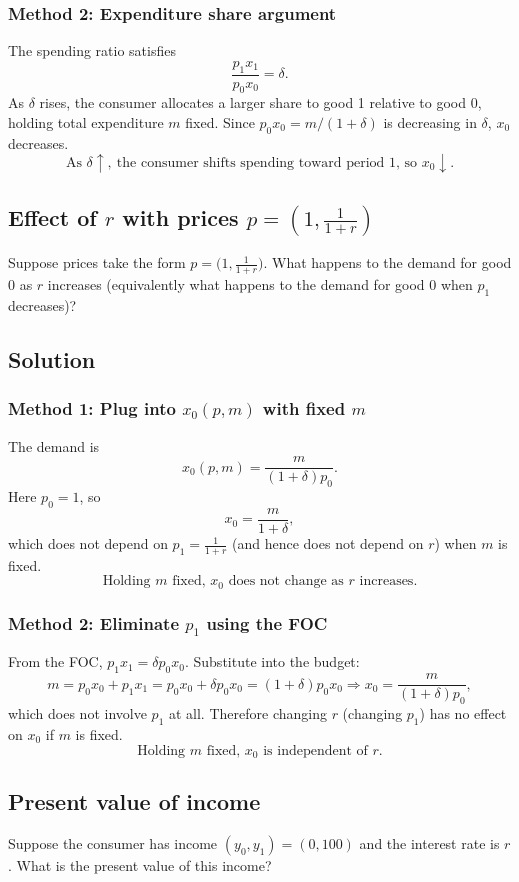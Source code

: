 \documentclass[12pt]{article}
\begin{document}
\subsubsection*{Method 2: Expenditure share argument}
The spending ratio satisfies
\[
\frac{p_1x_1}{p_0x_0}=\delta.
\]
As \(\delta\) rises, the consumer allocates a larger share to good 1 relative to good 0, holding total expenditure \(m\) fixed. Since \(p_0x_0=m/(1+\delta)\) is decreasing in \(\delta\), \(x_0\) decreases.
\[
\boxed{\;\text{As }\delta\uparrow,\ \text{the consumer shifts spending toward period 1, so }x_0\downarrow.\;}
\]

\subsection{Effect of \(r\) with prices \(p=(1,\frac{1}{1+r})\)}
Suppose prices take the form \(p=\bigl(1,\frac{1}{1+r}\bigr)\). What happens to the demand for good 0 as
\(r\) increases (equivalently what happens to the demand for good 0 when \(p_1\) decreases)?

\subsection*{Solution}
\subsubsection*{Method 1: Plug into \(x_0(p,m)\) with fixed \(m\)}
The demand is
\[
x_0(p,m)=\frac{m}{(1+\delta)p_0}.
\]
Here \(p_0=1\), so
\[
x_0=\frac{m}{1+\delta},
\]
which does not depend on \(p_1=\frac{1}{1+r}\) (and hence does not depend on \(r\)) when \(m\) is fixed.
\[
\boxed{\;\text{Holding }m\text{ fixed, }x_0\text{ does not change as }r\text{ increases.}\;}
\]

\subsubsection*{Method 2: Eliminate \(p_1\) using the FOC}
From the FOC, \(p_1x_1=\delta p_0x_0\). Substitute into the budget:
\[
m=p_0x_0+p_1x_1=p_0x_0+\delta p_0x_0=(1+\delta)p_0x_0
\Rightarrow
x_0=\frac{m}{(1+\delta)p_0},
\]
which does not involve \(p_1\) at all. Therefore changing \(r\) (changing \(p_1\)) has no effect on \(x_0\) if \(m\) is fixed.
\[
\boxed{\;\text{Holding }m\text{ fixed, }x_0\text{ is independent of }r.\;}
\]

\subsection{Present value of income}
Suppose the consumer has income \((y_0,y_1)=(0,100)\) and the interest rate is \(r\). What
is the present value of this income?
\end{document}
